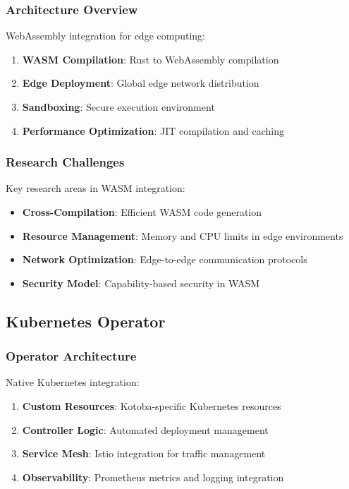 \documentclass[11pt,a4paper]{article}
\begin{document}
\subsubsection{Architecture Overview}
\label{subsubsec:wasm_architecture}

WebAssembly integration for edge computing:

\begin{enumerate}
\item \textbf{WASM Compilation}: Rust to WebAssembly compilation
\item \textbf{Edge Deployment}: Global edge network distribution
\item \textbf{Sandboxing}: Secure execution environment
\item \textbf{Performance Optimization}: JIT compilation and caching
\end{enumerate}

\subsubsection{Research Challenges}
\label{subsubsec:wasm_challenges}

Key research areas in WASM integration:

\begin{itemize}
\item \textbf{Cross-Compilation}: Efficient WASM code generation
\item \textbf{Resource Management}: Memory and CPU limits in edge environments
\item \textbf{Network Optimization}: Edge-to-edge communication protocols
\item \textbf{Security Model}: Capability-based security in WASM
\end{itemize}

\subsection{Kubernetes Operator}
\label{subsec:k8s_operator}

\subsubsection{Operator Architecture}
\label{subsubsec:k8s_architecture}

Native Kubernetes integration:

\begin{enumerate}
\item \textbf{Custom Resources}: Kotoba-specific Kubernetes resources
\item \textbf{Controller Logic}: Automated deployment management
\item \textbf{Service Mesh}: Istio integration for traffic management
\item \textbf{Observability}: Prometheus metrics and logging integration
\end{enumerate}
\end{document}
